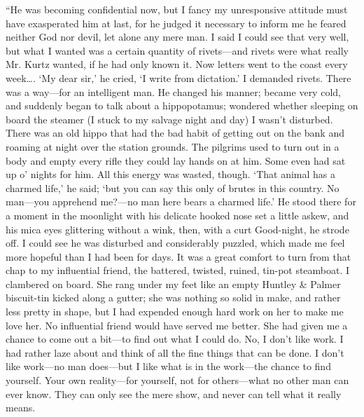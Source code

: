 \documentclass[12pt]{report}
\begin{document}
``He was becoming confidential now, but I fancy my unresponsive attitude
must have exasperated him at last, for he judged it necessary to inform
me he feared neither God nor devil, let alone any mere man. I said I
could see that very well, but what I wanted was a certain quantity of
rivets---and rivets were what really Mr. Kurtz wanted, if he had only
known it. Now letters went to the coast every week\ldots{}. `My dear
sir,' he cried, `I write from dictation.' I demanded rivets. There was a
way---for an intelligent man. He changed his manner; became very cold,
and suddenly began to talk about a hippopotamus; wondered whether
sleeping on board the steamer (I stuck to my salvage night and day) I
wasn't disturbed. There was an old hippo that had the bad habit of
getting out on the bank and roaming at night over the station grounds.
The pilgrims used to turn out in a body and empty every rifle they could
lay hands on at him. Some even had sat up o' nights for him. All this
energy was wasted, though. `That animal has a charmed life,' he said;
`but you can say this only of brutes in this country. No man---you
apprehend me?---no man here bears a charmed life.' He stood there for a
moment in the moonlight with his delicate hooked nose set a little
askew, and his mica eyes glittering without a wink, then, with a curt
Good-night, he strode off. I could see he was disturbed and considerably
puzzled, which made me feel more hopeful than I had been for days. It
was a great comfort to turn from that chap to my influential friend, the
battered, twisted, ruined, tin-pot steamboat. I clambered on board. She
rang under my feet like an empty Huntley \& Palmer biscuit-tin kicked
along a gutter; she was nothing so solid in make, and rather less pretty
in shape, but I had expended enough hard work on her to make me love
her. No influential friend would have served me better. She had given me
a chance to come out a bit---to find out what I could do. No, I don't
like work. I had rather laze about and think of all the fine things that
can be done. I don't like work---no man does---but I like what is in the
work---the chance to find yourself. Your own reality---for yourself, not
for others---what no other man can ever know. They can only see the mere
show, and never can tell what it really means.
\end{document}
